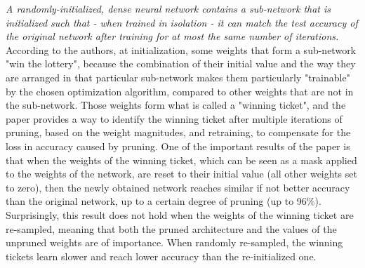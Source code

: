\textit{A randomly-initialized, dense neural network contains a sub-network that is initialized such that - when trained in isolation - it can match the test accuracy of the original network after training for at most the same number of iterations.} \\

According to the authors, at initialization, some weights that form a sub-network "win the lottery", because the combination of their initial value and the way they are arranged in that particular sub-network makes them particularly "trainable" by the chosen optimization algorithm, compared to other weights that are not in the sub-network. Those weights form what is called a "winning ticket", and the paper provides a way to identify the winning ticket after multiple iterations of pruning, based on the weight magnitudes, and retraining, to compensate for the loss in accuracy caused by pruning. One of the important results of the paper is that when the weights of the winning ticket, which can be seen as a mask applied to the weights of the network, are reset to their initial value (all other weights set to zero), then the newly obtained network reaches similar if not better accuracy than the original network, up to a certain degree of pruning (up to 96\%). Surprisingly, this result does not hold when the weights of the winning ticket are re-sampled, meaning that both the pruned architecture and the values of the unpruned weights are of importance. When randomly re-sampled, the winning tickets learn slower and reach lower accuracy than the re-initialized one. \\

